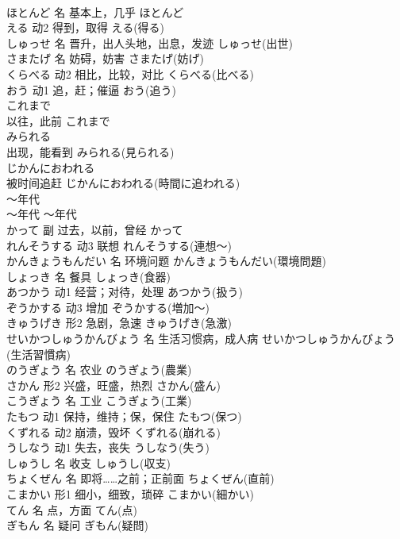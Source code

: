 \documentclass[8pt]{extreport}
\begin{document}
\begin{CJK}{UTF8}{min}
\\	ほとんど	名	基本上，几乎	ほとんど	
\\	える	动2	得到，取得	える(得る)	
\\	しゅっせ	名	晋升，出人头地，出息，发迹	しゅっせ(出世)	
\\	さまたげ	名	妨碍，妨害	さまたげ(妨げ)	
\\	くらべる	动2	相比，比较，对比	くらべる(比べる)	
\\	おう	动1	追，赶；催逼	おう(追う)	
\\	これまで	
\\	以往，此前	これまで	
\\	みられる	
\\	出现，能看到	みられる(見られる)	
\\	じかんにおわれる	
\\	被时间追赶	じかんにおわれる(時間に追われる)	
\\	～年代	
\\	～年代	～年代	
\\	かって	副	过去，以前，曾经	かって	
\\	れんそうする	动3	联想	れんそうする(連想～)	
\\	かんきょうもんだい	名	环境问题	かんきょうもんだい(環境問題)	
\\	しょっき	名	餐具	しょっき(食器)	
\\	あつかう	动1	经营；对待，处理	あつかう(扱う)	
\\	ぞうかする	动3	增加	ぞうかする(増加～)	
\\	きゅうげき	形2	急剧，急速	きゅうげき(急激)	
\\	せいかつしゅうかんびょう	名	生活习惯病，成人病	せいかつしゅうかんびょう(生活習慣病)	
\\	のうぎょう	名	农业	のうぎょう(農業)	
\\	さかん	形2	兴盛，旺盛，热烈	さかん(盛ん)	
\\	こうぎょう	名	工业	こうぎょう(工業)	
\\	たもつ	动1	保持，维持；保，保住	たもつ(保つ)	
\\	くずれる	动2	崩溃，毁坏	くずれる(崩れる)	
\\	うしなう	动1	失去，丧失	うしなう(失う)	
\\	しゅうし	名	收支	しゅうし(収支)	
\\	ちょくぜん	名	即将……之前；正前面	ちょくぜん(直前)	
\\	こまかい	形1	细小，细致，琐碎	こまかい(細かい)	
\\	てん	名	点，方面	てん(点)	
\\	ぎもん	名	疑问	ぎもん(疑問)	

\end{CJK}
\end{document}
